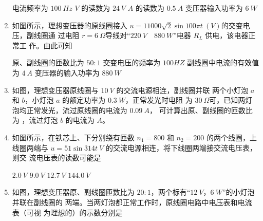 \begin{enumerate}
\fourchoices
{电流频率为 $ 100 \ Hz $}
{$ V $ 的读数为 $ 24 \ V $}
{$ A $ 的读数为 $ 0.5 \ A $}
{变压器输入功率为 $ 6 \ W $}



\item 
{}
如图所示，理想变压器的原线圈接入 $ u =11000\sqrt{2} \sin 100 \pi t \ (V) $的交变电压，副线圈通
过电阻 $ r=6 \ \Omega $导线对“$ 220 \ V \quad 880 \ W $”电器 $ R_{L} $ 供电，该电器正常工
作。由此可知  
\begin{figure}[h!]
\centering

\end{figure}

\fourchoices
{原、副线圈的匝数比为 $ 50:1 $}
{交变电压的频率为 $ 100HZ $}
{副线圈中电流的有效值为 $ 4 \ A $}
{变压器的输入功率为 $ 880 \ W $}



\item 
{}
如图，理想变压器原线圈与 $ 10 \ V $ 的交流电源相连，副线圈并联
两个小灯泡 $ a $ 和 $ b $，小灯泡 $ a $ 的额定功率为 $ 0.3 \ W $，正常发光时电阻
为 $ 30 \ \Omega $可，已知两灯泡均正常发光，流过原线圈的电流为 $ 0.09 \ A $，
可计算出原、副线圈的匝数比为 \underlinegap ，流过灯泡 $ b $ 的电流为 \underlinegap $ A $。
\begin{figure}[h!]
\centering

\end{figure}






\item 
{}
如图所示，在铁芯上、下分别绕有匝数 $ n_{1} =800 $ 和 $ n_{2} =200 $ 的两个线圈，上
线圈两端与 $ u=51 \sin 314t \ V $ 的交流电源相连，将下线圈两端接交流电压表，则交
流电压表的读数可能是  
\begin{figure}[h!]
\centering

\end{figure}

\fourchoices
{$ 2.0 \ V $}
{$ 9.0 \ V $}
{$ 12.7 \ V $}
{$ 144.0 \ V $}


\item 
{}
如图，理想变压器原、副线圈匝数比为 $ 20:1 $，两个标有“$ 12 \ V $，$ 6 \ W $”的小灯泡并联在副线圈的
两端。当两灯泡都正常工作时，原线圈电路中电压表和电流表（可视
为理想的）的示数分别是  
\begin{figure}[h!]
\centering

\end{figure}



\end{enumerate}
